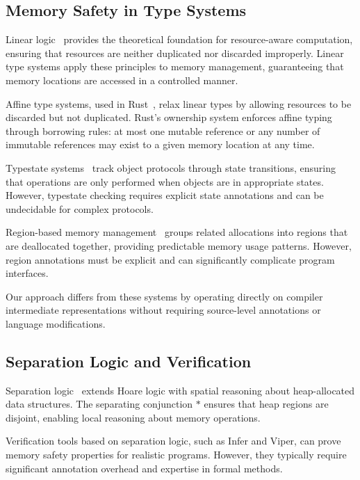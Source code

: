 \documentclass[journal]{IEEEtran}
\begin{document}
\subsection{Memory Safety in Type Systems}

Linear logic~\cite{girard1987linear} provides the theoretical foundation for resource-aware computation, ensuring that resources are neither duplicated nor discarded improperly. Linear type systems apply these principles to memory management, guaranteeing that memory locations are accessed in a controlled manner.

Affine type systems, used in Rust~\cite{matsakis2014rust}, relax linear types by allowing resources to be discarded but not duplicated. Rust's ownership system enforces affine typing through borrowing rules: at most one mutable reference or any number of immutable references may exist to a given memory location at any time.

Typestate systems~\cite{strom1986typestate} track object protocols through state transitions, ensuring that operations are only performed when objects are in appropriate states. However, typestate checking requires explicit state annotations and can be undecidable for complex protocols.

Region-based memory management~\cite{grossman2002region} groups related allocations into regions that are deallocated together, providing predictable memory usage patterns. However, region annotations must be explicit and can significantly complicate program interfaces.

Our approach differs from these systems by operating directly on compiler intermediate representations without requiring source-level annotations or language modifications.

\subsection{Separation Logic and Verification}

Separation logic~\cite{reynolds2002separation} extends Hoare logic with spatial reasoning about heap-allocated data structures. The separating conjunction $*$ ensures that heap regions are disjoint, enabling local reasoning about memory operations.

Verification tools based on separation logic, such as Infer and Viper, can prove memory safety properties for realistic programs. However, they typically require significant annotation overhead and expertise in formal methods.
\end{document}
